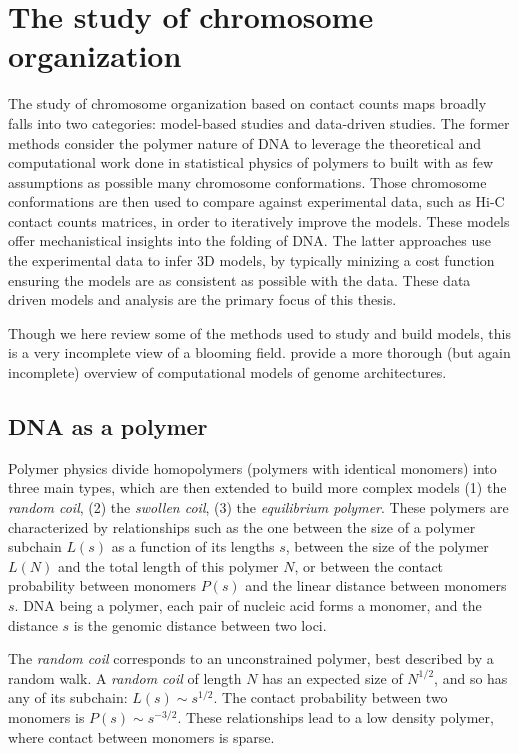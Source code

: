 \section{The study of chromosome organization}

The study of chromosome organization based on contact counts maps broadly
falls into two categories: model-based studies and data-driven studies. The
former methods consider the polymer nature of DNA to leverage the theoretical
and computational work done in statistical physics of polymers to built with
as few assumptions as possible many chromosome conformations. Those chromosome
conformations are then used to compare against experimental data, such as Hi-C
contact counts matrices, in order to iteratively improve the models. These
models offer mechanistical insights into the folding of DNA. The latter
approaches use the experimental data to infer 3D models, by typically minizing
a cost function ensuring the models are as consistent as possible with the
data. These data driven models and analysis are the primary focus of this
thesis.

Though we here review some of the methods used to study and build models, this
is a very incomplete view of a blooming field. \citet{rosa:computational}
provide a more thorough (but again incomplete) overview of computational models
of genome architectures.

\subsection{DNA as a polymer}

Polymer physics divide homopolymers (polymers with identical monomers) into
three main types, which are then extended to build more complex models (1) the
\textit{random coil}, (2) the \textit{swollen coil}, (3) the
\textit{equilibrium polymer}. These polymers are characterized by
relationships such as the one between the size of a polymer subchain $L(s)$ as
a function of its lengths $s$, between the size of the polymer $L(N)$ and the
total length of this polymer $N$, or between the contact probability between
monomers $P(s)$ and the linear distance between monomers $s$. DNA being a
polymer, each pair of nucleic acid forms a monomer, and the distance $s$ is the
genomic distance between two loci.

The \textit{random coil} corresponds to an unconstrained polymer, best
described by a random walk. A \textit{random coil} of length $N$ has an
expected size of $N^{1/2}$, and so has any of its subchain: $L(s) \sim
s^{1/2}$. The contact probability between two monomers is $P(s) \sim
s^{-3/2}$. These relationships lead to a low density polymer, where contact
between monomers is sparse.

